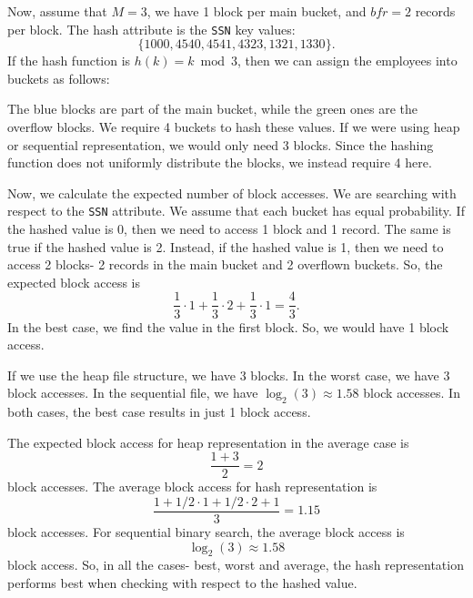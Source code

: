 \documentclass[a4paper, openany]{memoir}
\begin{document}
Now, assume that $M = 3$, we have 1 block per main bucket, and $\textit{bfr} = 2$ records per block. The hash attribute is the \texttt{SSN} key values:
\[\{1000, 4540, 4541, 4323, 1321, 1330\}.\]
If the hash function is $h(k) = k \bmod{3}$, then we can assign the employees into buckets as follows:
\begin{figure}[H]
    \centering
\end{figure}
\noindent The blue blocks are part of the main bucket, while the green ones are the overflow blocks. We require 4 buckets to hash these values. If we were using heap or sequential representation, we would only need 3 blocks. Since the hashing function does not uniformly distribute the blocks, we instead require 4 here.

Now, we calculate the expected number of block accesses. We are searching with respect to the \texttt{SSN} attribute. We assume that each bucket has equal probability. If the hashed value is 0, then we need to access 1 block and 1 record. The same is true if the hashed value is 2. Instead, if the hashed value is 1, then we need to access 2 blocks- 2 records in the main bucket and 2 overflown buckets. So, the expected block access is
\[\frac{1}{3} \cdot 1 + \frac{1}{3} \cdot 2 + \frac{1}{3} \cdot 1 = \frac{4}{3}.\]
In the best case, we find the value in the first block. So, we would have 1 block access.

If we use the heap file structure, we have 3 blocks. In the worst case, we have 3 block accesses. In the sequential file, we have $\log_2(3) \approx 1.58$ block accesses. In both cases, the best case results in just 1 block access. 

The expected block access for heap representation in the average case is
\[\frac{1 + 3}{2} = 2\]
block accesses. The average block access for hash representation is
\[\frac{1 + 1/2 \cdot 1 + 1/2 \cdot 2 + 1}{3} = 1.15\]
block accesses. For sequential binary search, the average block access is
\[\log_2(3) \approx 1.58\]
block access. So, in all the cases- best, worst and average, the hash representation performs best when checking with respect to the hashed value.
\end{document}
